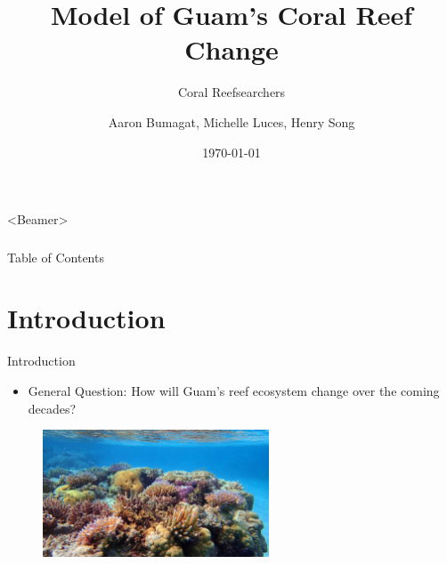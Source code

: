 \documentclass{beamer}
\title[]{Model of Guam's Coral Reef Change}
\subtitle{Coral Reefsearchers}
\author{Aaron Bumagat, Michelle Luces, Henry Song }
\institute{University of Guam}
\date{\today}
\begin{document}
\frame{\titlepage}

\AtBeginSection[]{}
\begin{frame}<Beamer>
\frametitle{}
\setcounter{tocdepth}{2}
\setcounter{tocdepth}{1}
\end{frame}

\begin{frame}{Table of Contents}
\tableofcontents
\end{frame}

\section{Introduction}
\begin{frame}{Introduction}
\begin{itemize}
    \item General Question: How will Guam's reef ecosystem change over the coming decades?
\end{itemize}
\begin{figure}
    \centering
    \includegraphics[width=0.6\textwidth]{Figures/coral_picture.jpg}
\end{figure}
\end{frame}

\end{document}
